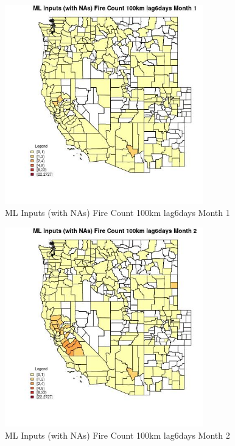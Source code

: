 \begin{figure} 
\centering  
\includegraphics[width=0.77\textwidth]{Code_Outputs/Report_ML_input_PM25_Step4_part_f_de_duplicated_aves_prioritize_24hr_obswNAs_CountyFire_Count_100km_lag6daysmedianMonth1.jpg} 
\caption{\label{fig:Report_ML_input_PM25_Step4_part_f_de_duplicated_aves_prioritize_24hr_obswNAsCountyFire_Count_100km_lag6daysmedianMonth1}ML Inputs (with NAs) Fire Count 100km lag6days Month 1} 
\end{figure} 
 

\begin{figure} 
\centering  
\includegraphics[width=0.77\textwidth]{Code_Outputs/Report_ML_input_PM25_Step4_part_f_de_duplicated_aves_prioritize_24hr_obswNAs_CountyFire_Count_100km_lag6daysmedianMonth2.jpg} 
\caption{\label{fig:Report_ML_input_PM25_Step4_part_f_de_duplicated_aves_prioritize_24hr_obswNAsCountyFire_Count_100km_lag6daysmedianMonth2}ML Inputs (with NAs) Fire Count 100km lag6days Month 2} 
\end{figure} 
 


